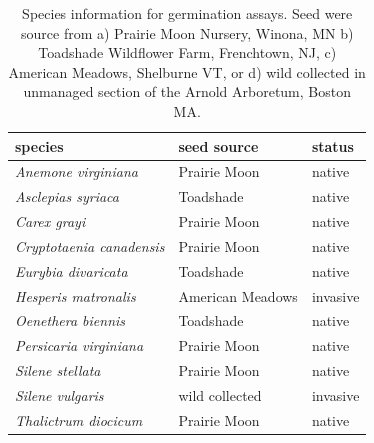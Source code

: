 \documentclass{article}
\begin{document}
\begin{table}[!ht]
\centering
\begin{tabular}{|l|l|l|}
\hline
species & seed source & status  \\
\hline
\textit{Anemone virginiana} & Prairie Moon & native  \\
\textit{Asclepias syriaca} & Toadshade & native  \\
\textit{Carex grayi} & Prairie Moon & native  \\
\textit{Cryptotaenia canadensis} & Prairie Moon & native  \\
\textit{Eurybia divaricata} & Toadshade & native  \\
\textit{Hesperis matronalis} & American Meadows & invasive  \\
\textit{Oenethera biennis} & Toadshade & native  \\
\textit{Persicaria virginiana} & Prairie Moon & native  \\
\textit{Silene stellata} & Prairie Moon & native  \\
\textit{Silene vulgaris} & wild collected & invasive  \\
\textit{Thalictrum diocicum} & Prairie Moon & native  \\
\hline
\end{tabular}
\caption{Species information for germination assays. Seed were source from a) Prairie Moon Nursery, Winona, MN b) Toadshade Wildflower Farm, Frenchtown, NJ, c) American Meadows, Shelburne VT, or d) wild collected in unmanaged section of the Arnold Arboretum, Boston MA. }
\label{tab:specs}
\end{table}
\end{document}
